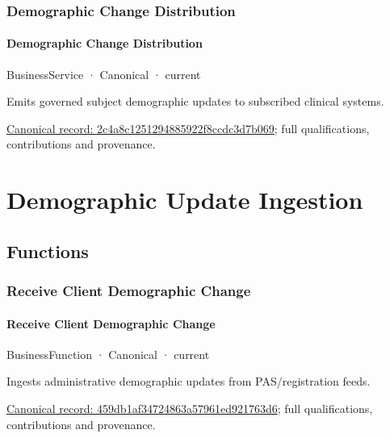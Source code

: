 \subsubsection{Demographic Change Distribution}

\paragraph{Demographic Change Distribution}

\label{element:2c4a8c1251294885922f8ccdc3d7b069}
{\small BusinessService · Canonical · current}\par

Emits governed subject demographic updates to subscribed clinical systems.


{\footnotesize \href{../../../../continuum/business/business-service/2c4a8c1251294885922f8ccdc3d7b069.md}{Canonical record: 2c4a8c1251294885922f8ccdc3d7b069}; full qualifications, contributions and provenance.}\par
\section{Demographic Update Ingestion}

\subsection{Functions}

\subsubsection{Receive Client Demographic Change}

\paragraph{Receive Client Demographic Change}

\label{element:459db1af34724863a57961ed921763d6}
{\small BusinessFunction · Canonical · current}\par

Ingests administrative demographic updates from PAS/registration feeds.


{\footnotesize \href{../../../../continuum/business/business-function/459db1af34724863a57961ed921763d6.md}{Canonical record: 459db1af34724863a57961ed921763d6}; full qualifications, contributions and provenance.}\par
